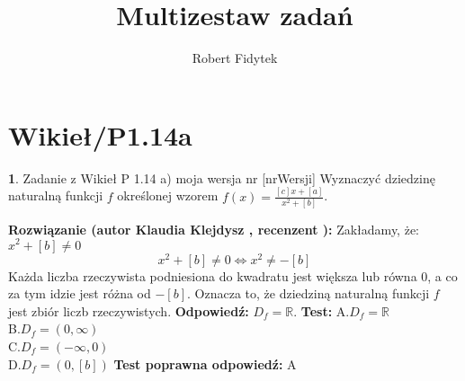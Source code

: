\documentclass[12pt, a4paper]{article}
\title{Multizestaw zadań}
\author{Robert Fidytek}
\date{}
\theoremstyle{definition} %
\newtheorem{zad}{}
\newcommand{\kategoria}[1]{\section{#1}} %
\newcommand{\zadStart}[1]{\begin{zad}#1\newline} %
\newcommand{\zadStop}{\end{zad}}   %
\newcommand{\rozwStart}[2]{\noindent \textbf{Rozwiązanie (autor #1 , recenzent #2): }\newline} %
\newcommand{\rozwStop}{\newline}                                            %
\newcommand{\odpStart}{\noindent \textbf{Odpowiedź:}\newline}    %
\newcommand{\odpStop}{\newline}                                             %
\newcommand{\testStart}{\noindent \textbf{Test:}\newline} %
\newcommand{\testStop}{\newline} %
\newcommand{\kluczStart}{\noindent \textbf{Test poprawna odpowiedź:}\newline} %
\newcommand{\kluczStop}{\newline} %
\begin{document}
\maketitle


\kategoria{Wikieł/P1.14a}
\zadStart{Zadanie z Wikieł P 1.14 a) moja wersja nr [nrWersji]}
Wyznaczyć dziedzinę naturalną funkcji $f$ określonej wzorem $f(x)=\frac{[c]x+[a]}{x^2+[b]}$.
\zadStop
\rozwStart{Klaudia Klejdysz}{}
Zakładamy, że: $x^2+[b] \neq 0$
$$
x^2+[b]\neq 0  \Leftrightarrow  x^2\neq -[b]
$$
Każda liczba rzeczywista podniesiona do kwadratu jest większa lub równa 0, a co za tym idzie jest różna od $-[b]$. Oznacza to, że dziedziną naturalną funkcji $f$ jest zbiór liczb rzeczywistych.
\rozwStop
\odpStart
$D_{f}=\mathbb{R}$.
\odpStop
\testStart
A.$D_{f}=\mathbb{R}$\\
B.$D_{f}=(0,\infty)$\\
C.$D_{f}=(-\infty,0)$\\
D.$D_{f}=(0,[b])$
\testStop
\kluczStart
A
\kluczStop
\end{document}
